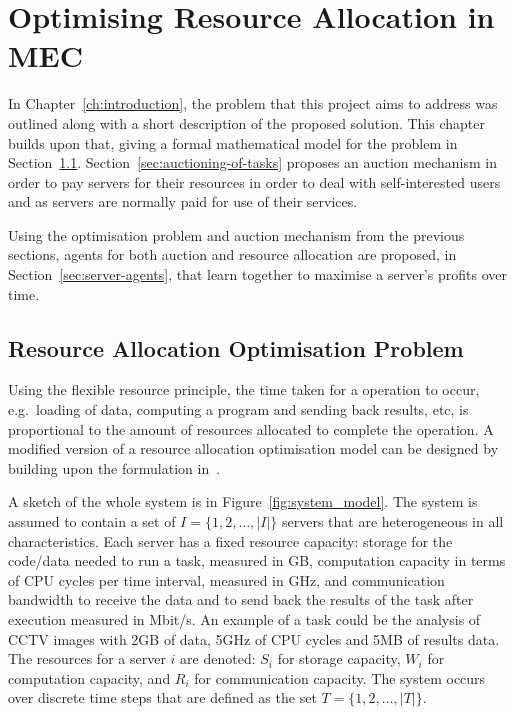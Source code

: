 

\chapter{Optimising Resource Allocation in MEC}
\label{ch:optimising-resource-allocation-in-mec}
In Chapter~\ref{ch:introduction}, the problem that this project aims to address was outlined along with a short
description of the proposed solution. This chapter builds upon that, giving a formal mathematical model for the problem
in Section~\ref{sec:resource-allocation-optimisation-problem}. Section~\ref{sec:auctioning-of-tasks} proposes an
auction mechanism in order to pay servers for their resources in order to deal with self-interested users and as servers
are normally paid for use of their services.

Using the optimisation problem and auction mechanism from the previous sections, agents for both auction and resource
allocation are proposed, in Section~\ref{sec:server-agents}, that learn together to maximise a server's profits
over time.

\section{Resource Allocation Optimisation Problem}
\label{sec:resource-allocation-optimisation-problem}
Using the flexible resource principle, the time taken for a operation to occur, e.g.\ loading of data, computing
a program and sending back results, etc, is proportional to the amount of resources allocated to complete the operation.
A modified version of a resource allocation optimisation model can be designed by building upon the formulation
in~\cite{FlexibleResourceAllocation}.

A sketch of the whole system is in Figure~\ref{fig:system_model}.
The system is assumed to contain a set of $I = \{1,2,\ldots,\left|I\right|\}$ servers that are heterogeneous in all
characteristics. Each server has a fixed resource capacity: storage for the code/data needed to run a task,
measured in GB, computation capacity in terms of CPU cycles per time interval, measured in GHz,
and communication bandwidth to receive the data and to send back the results of the task after execution
measured in Mbit/s. An example of a task could be the analysis of CCTV images with 2GB of data, 5GHz of CPU
cycles and 5MB of results data. The resources for a server $i$ are denoted: $S_i$ for storage capacity, $W_i$ for
computation capacity, and $R_i$ for communication capacity. The system occurs over discrete time steps that are defined
as the set $T = \{1,2,\ldots,\left|T\right|\}$.

